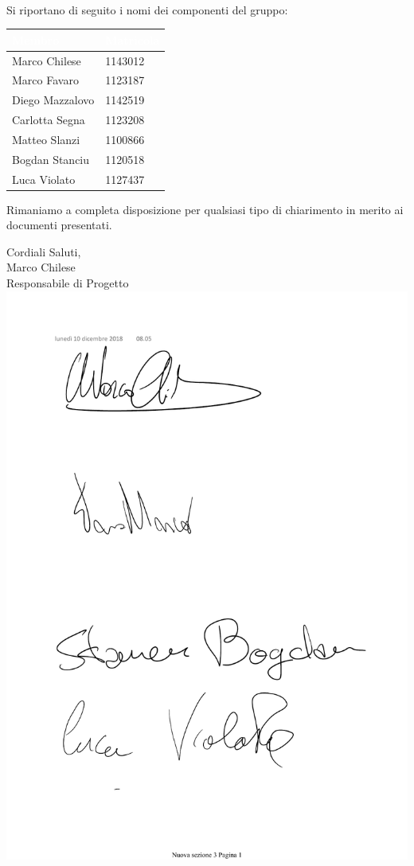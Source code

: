 \documentclass[11pt, a4paper]{letter} %
\begin{document}
\begin{letter}
		\-\\
		Si riportano di seguito i nomi dei componenti del gruppo:
		\begin{center}
			\begin{longtable}[c]{|m{}|m{}|} 
				\hline
				\rowcolor{bluelogo}\textbf{\textcolor{white}{Membro}}  & \textbf{\textcolor{white}{Matricola}}\\
				\hline
				Marco Chilese & 1143012\\
				\hline
				\rowcolor{grigio}Marco Favaro & 1123187\\ 
				\hline
				Diego Mazzalovo & 1142519\\
				\hline
				\rowcolor{grigio}Carlotta Segna & 1123208\\
				\hline
				Matteo Slanzi & 1100866\\
				\hline
				\rowcolor{grigio}Bogdan Stanciu  & 1120518\\
				\hline
				Luca Violato & 1127437\\
				\hline
			\end{longtable}
		\end{center}
		
		Rimaniamo a completa disposizione per qualsiasi tipo di chiarimento in merito ai documenti presentati.
		
		\closing{Cordiali Saluti,\\
			Marco Chilese\\
			Responsabile di Progetto
			\includegraphics[scale=0.5]{images/MarcoChilese.pdf}}
		

\end{letter}
\end{document}
